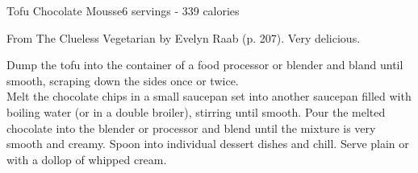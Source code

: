 \begin{recipe}{Tofu Chocolate Mousse}{6 servings - 339 calories}{}

\freeform From {\normalfont The Clueless Vegetarian} by Evelyn Raab (p. 207). Very delicious.


Dump the tofu into the container of a food processor or blender and bland until smooth, scraping down the sides once or twice.\\

Melt the chocolate chips in a small saucepan set into another saucepan filled with boiling water (or in a double broiler), stirring until smooth. Pour the melted chocolate into the blender or processor and blend until the mixture is very smooth and creamy. Spoon into individual dessert dishes and chill. Serve plain or with a dollop of whipped cream. 

\end{recipe}